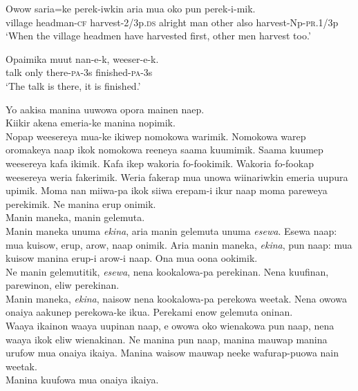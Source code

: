 \ea\label{ex:a:x34}
\gll  Owow  saria=ke  perek-iwkin  aria  mua  oko  pun  perek-i-mik. \\
village  headman-\textsc{cf}  harvest-2/3p.\textsc{ds}  alright  man  other  also  harvest-Np-\textsc{pr}.1/3p \\
\glt ‘When the village headmen have harvested first, other men harvest too.’ \\
\z


\ea\label{ex:a:x35}
\gll  Opaimika  muut  nan-e-k,  weeser-e-k. \\
talk  only  there-\textsc{pa}-3s  finished-\textsc{pa}-3s \\
\glt ‘The talk is there, it is finished.’ \\
\z


Yo aakisa manina uuwowa opora mainen naep. \\
Kiikir akena emeria-ke manina nopimik. \\
\textrm{Nopap weesereya  mua-ke ikiwep nomokowa warimik. }
\textrm{Nomokowa warep oromakeya naap ikok nomokowa reeneya  saama kuumimik. }
\textrm{Saama kuumep weesereya kafa ikimik. }
\textrm{Kafa ikep wakoria fo-fookimik. }
\textrm{Wakoria fo-fookap weesereya weria fakerimik. }
\textrm{Weria fakerap mua unowa wiinariwkin emeria uupura upimik. }
\textrm{Moma nan miiwa-pa ikok siiwa erepam-i ikur naap moma pareweya perekimik. }
Ne manina erup onimik. \\
Manin maneka, manin gelemuta. \\
\textrm{Manin maneka unuma }\textrm{\textit{ekina}}\textrm{,  aria manin gelemuta unuma }\textrm{\textit{esewa}}\textrm{. }
\textrm{Esewa naap:  mua kuisow, erup, arow, naap onimik. }
\textrm{Aria manin maneka, }\textrm{\textit{ekina}}\textrm{, pun naap:  mua kuisow manina erup-i arow-i naap. }
Ona mua oona ookimik. \\
\textrm{Ne manin gelemutitik, }\textrm{\textit{esewa}}\textrm{, nena kookalowa-pa perekinan. }
Nena kuufinan,  parewinon,  eliw perekinan. \\
\textrm{Manin maneka, }\textrm{\textit{ekina}}\textrm{, naisow nena kookalowa-pa perekowa weetak. }
\textrm{Nena owowa onaiya aakunep perekowa-ke ikua. }
Perekami  enow gelemuta oninan. \\
\textrm{Waaya ikainon waaya uupinan naap,  e owowa oko wienakowa pun naap,  nena waaya ikok  eliw wienakinan. }
\textrm{Ne manina pun naap,  manina mauwap manina urufow mua onaiya ikaiya. }
Manina waisow mauwap neeke wafurap-puowa nain weetak. \\
Manina kuufowa mua onaiya ikaiya. \\
